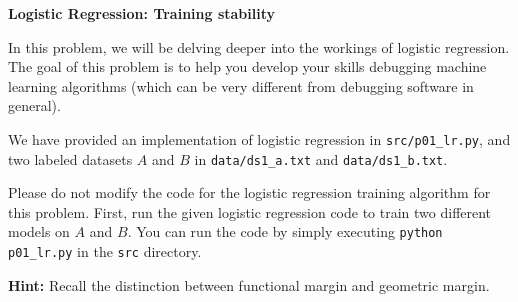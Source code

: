 \clearpage
\item {} {\bf Logistic Regression: Training stability}

In this problem, we will be delving deeper into the workings of logistic
regression. The goal of this problem is to help you develop your skills
debugging machine learning algorithms (which can be very different from
debugging software in general).

We have provided an implementation of logistic regression in
\texttt{src/p01\_lr.py}, and two labeled datasets $A$ and $B$ in
\texttt{data/ds1\_a.txt} and \texttt{data/ds1\_b.txt}.

Please do not modify the code for the logistic regression training algorithm
for this problem. First, run the given logistic regression code to train two
different models on $A$ and $B$. You can run the code by simply executing 
\texttt{python p01\_lr.py} in the \texttt{src} directory.

\begin{enumerate}

  

  

  
  
  

\end{enumerate}

\textbf{Hint:} Recall the distinction between functional margin and geometric
margin.
